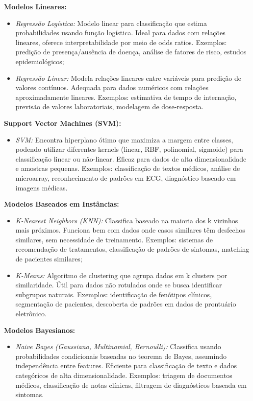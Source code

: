 \documentclass[12pt, a4paper]{report}
\theoremstyle{definition}
\theoremstyle{remark}
\theoremstyle{plain}
\begin{document}
\textbf{Modelos Lineares:}
\begin{itemize}[noitemsep,topsep=0pt]
    \item \textit{Regressão Logística:} Modelo linear para classificação que estima probabilidades usando função logística. Ideal para dados com relações lineares, oferece interpretabilidade por meio de odds ratios. Exemplos: predição de presença/ausência de doença, análise de fatores de risco, estudos epidemiológicos;
    
    \item \textit{Regressão Linear:} Modela relações lineares entre variáveis para predição de valores contínuos. Adequada para dados numéricos com relações aproximadamente lineares. Exemplos: estimativa de tempo de internação, previsão de valores laboratoriais, modelagem de dose-resposta.
\end{itemize}

\textbf{Support Vector Machines (SVM):}
\begin{itemize}[noitemsep,topsep=0pt]
    \item \textit{SVM:} Encontra hiperplano ótimo que maximiza a margem entre classes, podendo utilizar diferentes kernels (linear, RBF, polinomial, sigmoide) para classificação linear ou não-linear. Eficaz para dados de alta dimensionalidade e amostras pequenas. Exemplos: classificação de textos médicos, análise de microarray, reconhecimento de padrões em ECG, diagnóstico baseado em imagens médicas.
\end{itemize}

\textbf{Modelos Baseados em Instâncias:}
\begin{itemize}[noitemsep,topsep=0pt]
    \item \textit{K-Nearest Neighbors (KNN):} Classifica baseado na maioria dos k vizinhos mais próximos. Funciona bem com dados onde casos similares têm desfechos similares, sem necessidade de treinamento. Exemplos: sistemas de recomendação de tratamentos, classificação de padrões de sintomas, matching de pacientes similares;
    
    \item \textit{K-Means:} Algoritmo de clustering que agrupa dados em k clusters por similaridade. Útil para dados não rotulados onde se busca identificar subgrupos naturais. Exemplos: identificação de fenótipos clínicos, segmentação de pacientes, descoberta de padrões em dados de prontuário eletrônico.
\end{itemize}

\textbf{Modelos Bayesianos:}
\begin{itemize}[noitemsep,topsep=0pt]
    \item \textit{Naive Bayes (Gaussiano, Multinomial, Bernoulli):} Classifica usando probabilidades condicionais baseadas no teorema de Bayes, assumindo independência entre features. Eficiente para classificação de texto e dados categóricos de alta dimensionalidade. Exemplos: triagem de documentos médicos, classificação de notas clínicas, filtragem de diagnósticos baseada em sintomas.
\end{itemize}
\end{document}
